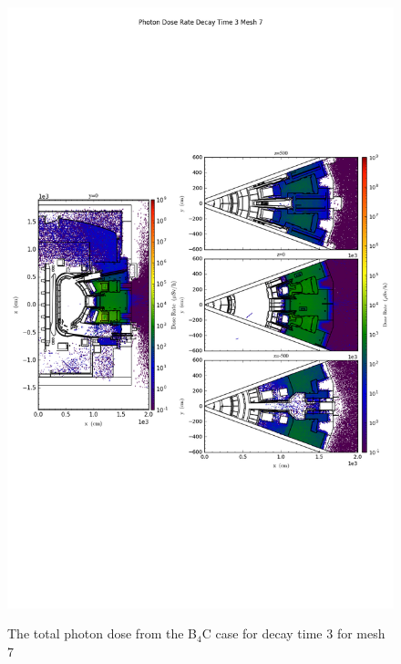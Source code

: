 \begin{figure}[ht!]
\centering
\includegraphics[trim={0cm 9cm 0cm 10cm},clip,scale=0.75]{../plots/final_model_with_b4c/Photon_Dose_Rate_Decay_Time_3_Mesh_7.png}
\label{fig:photons_dc3_no4bc_m7_flux}
\caption{The total photon dose from the B$_4$C case for decay time 3 for mesh 7}
\end{figure}
